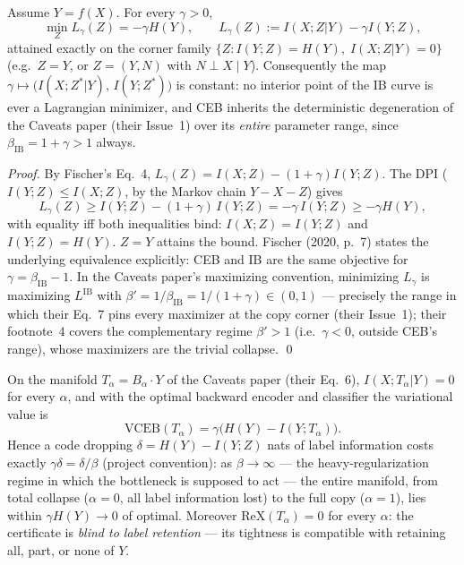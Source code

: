 \begin{proposition}\label{prop:dead}
Assume $Y = f(X)$. For every $\gamma > 0$,
\begin{equation}
\min_Z L_\gamma(Z) = -\gamma H(Y),
\qquad
L_\gamma(Z) := I(X;Z|Y) - \gamma I(Y;Z),
\label{eq:min}
\end{equation}
attained exactly on the corner family
$\{Z : I(Y;Z) = H(Y),\; I(X;Z|Y) = 0\}$ (e.g.\ $Z = Y$, or $Z = (Y, N)$ with
$N \perp X \mid Y$). Consequently the map
$\gamma \mapsto \big(I(X;Z^*|Y),\, I(Y;Z^*)\big)$ is constant: no interior point of the
IB curve is ever a Lagrangian minimizer, and CEB inherits the deterministic degeneration
of the Caveats paper (their Issue~1) over its \emph{entire} parameter range, since
$\beta_{\mathrm{IB}} = 1 + \gamma > 1$ always.
\end{proposition}

\begin{proof}
By Fischer's Eq.~4, $L_\gamma(Z) = I(X;Z) - (1+\gamma)I(Y;Z)$. The DPI
($I(Y;Z) \le I(X;Z)$, by the Markov chain $Y - X - Z$) gives
\begin{equation}
L_\gamma(Z) \ge I(Y;Z) - (1+\gamma)\,I(Y;Z)
= -\gamma\,I(Y;Z) \ge -\gamma H(Y),
\label{eq:chain}
\end{equation}
with equality iff both inequalities bind: $I(X;Z) = I(Y;Z)$ and $I(Y;Z) = H(Y)$.
$Z = Y$ attains the bound. Fischer (2020, p.~7) states the underlying equivalence
explicitly: CEB and IB are the same objective for $\gamma = \beta_{\mathrm{IB}} - 1$.
In the Caveats paper's maximizing convention, minimizing $L_\gamma$ is maximizing
$L^{\mathrm{IB}}$ with $\beta' = 1/\beta_{\mathrm{IB}} = 1/(1+\gamma) \in (0,1)$ ---
precisely the range in which their Eq.~7 pins every maximizer at the copy corner (their
Issue~1); their footnote~4 covers the complementary regime $\beta' > 1$ (i.e.\
$\gamma < 0$, outside CEB's range), whose maximizers are the trivial collapse. \hfill\qed
\end{proof}

\begin{proposition}\label{prop:flat}
On the manifold $T_\alpha = B_\alpha \cdot Y$ of the Caveats paper (their Eq.~6),
$I(X;T_\alpha|Y) = 0$ for every $\alpha$, and with the optimal backward encoder and
classifier the variational value is
\begin{equation}
\mathrm{VCEB}(T_\alpha) = \gamma\big(H(Y) - I(Y;T_\alpha)\big).
\label{eq:vceb}
\end{equation}
Hence a code dropping $\delta = H(Y) - I(Y;Z)$ nats of label information costs exactly
$\gamma\delta = \delta/\beta$ (project convention): as $\beta \to \infty$ --- the
heavy-regularization regime in which the bottleneck is supposed to act --- the entire
manifold, from total collapse ($\alpha = 0$, all label information lost) to the full copy
($\alpha = 1$), lies within $\gamma H(Y) \to 0$ of optimal. Moreover
$\mathrm{ReX}(T_\alpha) = 0$ for every $\alpha$: the certificate is \emph{blind to label
retention} --- its tightness is compatible with retaining all, part, or none of $Y$.
\end{proposition}

